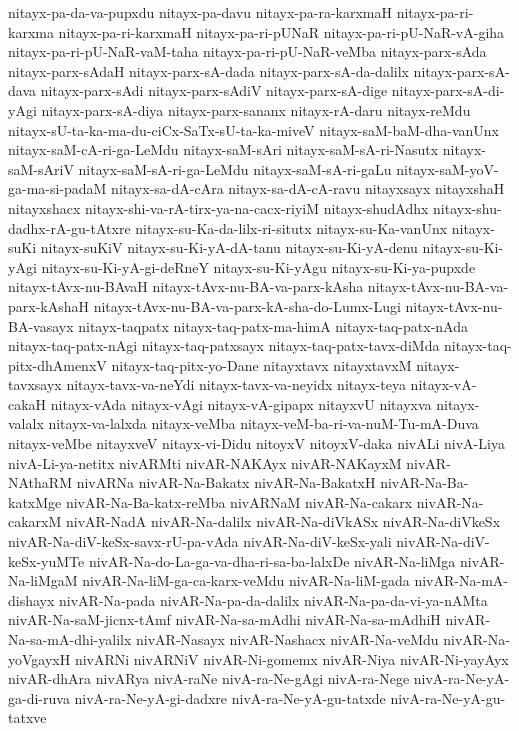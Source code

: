 {nitayx-pa-da-va-pupxdu
nitayx-pa-davu
nitayx-pa-ra-karxmaH
nitayx-pa-ri-karxma
nitayx-pa-ri-karxmaH
nitayx-pa-ri-pUNaR
nitayx-pa-ri-pU-NaR-vA-giha
nitayx-pa-ri-pU-NaR-vaM-taha
nitayx-pa-ri-pU-NaR-veMba
nitayx-parx-sAda
nitayx-parx-sAdaH
nitayx-parx-sA-dada
nitayx-parx-sA-da-dalilx
nitayx-parx-sA-dava
nitayx-parx-sAdi
nitayx-parx-sAdiV
nitayx-parx-sA-dige
nitayx-parx-sA-di-yAgi
nitayx-parx-sA-diya
nitayx-parx-sananx
nitayx-rA-daru
nitayx-reMdu
nitayx-sU-ta-ka-ma-du-ciCx-SaTx-sU-ta-ka-miveV
nitayx-saM-baM-dha-vanUnx
nitayx-saM-cA-ri-ga-LeMdu
nitayx-saM-sAri
nitayx-saM-sA-ri-Nasutx
nitayx-saM-sAriV
nitayx-saM-sA-ri-ga-LeMdu
nitayx-saM-sA-ri-gaLu
nitayx-saM-yoV-ga-ma-si-padaM
nitayx-sa-dA-cAra
nitayx-sa-dA-cA-ravu
nitayxsayx
nitayxshaH
nitayxshacx
nitayx-shi-va-rA-tirx-ya-na-cacx-riyiM
nitayx-shudAdhx
nitayx-shu-dadhx-rA-gu-tAtxre
nitayx-su-Ka-da-lilx-ri-situtx
nitayx-su-Ka-vanUnx
nitayx-suKi
nitayx-suKiV
nitayx-su-Ki-yA-dA-tanu
nitayx-su-Ki-yA-denu
nitayx-su-Ki-yAgi
nitayx-su-Ki-yA-gi-deRneY
nitayx-su-Ki-yAgu
nitayx-su-Ki-ya-pupxde
nitayx-tAvx-nu-BAvaH
nitayx-tAvx-nu-BA-va-parx-kAsha
nitayx-tAvx-nu-BA-va-parx-kAshaH
nitayx-tAvx-nu-BA-va-parx-kA-sha-do-Lumx-Lugi
nitayx-tAvx-nu-BA-vasayx
nitayx-taqpatx
nitayx-taq-patx-ma-himA
nitayx-taq-patx-nAda
nitayx-taq-patx-nAgi
nitayx-taq-patxsayx
nitayx-taq-patx-tavx-diMda
nitayx-taq-pitx-dhAmenxV
nitayx-taq-pitx-yo-Dane
nitayxtavx
nitayxtavxM
nitayx-tavxsayx
nitayx-tavx-va-neYdi
nitayx-tavx-va-neyidx
nitayx-teya
nitayx-vA-cakaH
nitayx-vAda
nitayx-vAgi
nitayx-vA-gipapx
nitayxvU
nitayxva
nitayx-valalx
nitayx-va-lalxda
nitayx-veMba
nitayx-veM-ba-ri-va-nuM-Tu-mA-Duva
nitayx-veMbe
nitayxveV
nitayx-vi-Didu
nitoyxV
nitoyxV-daka
nivALi
nivA-Liya
nivA-Li-ya-netitx
nivARMti
nivAR-NAKAyx
nivAR-NAKayxM
nivAR-NAthaRM
nivARNa
nivAR-Na-Bakatx
nivAR-Na-BakatxH
nivAR-Na-Ba-katxMge
nivAR-Na-Ba-katx-reMba
nivARNaM
nivAR-Na-cakarx
nivAR-Na-cakarxM
nivAR-NadA
nivAR-Na-dalilx
nivAR-Na-diVkASx
nivAR-Na-diVkeSx
nivAR-Na-diV-keSx-savx-rU-pa-vAda
nivAR-Na-diV-keSx-yali
nivAR-Na-diV-keSx-yuMTe
nivAR-Na-do-La-ga-va-dha-ri-sa-ba-lalxDe
nivAR-Na-liMga
nivAR-Na-liMgaM
nivAR-Na-liM-ga-ca-karx-veMdu
nivAR-Na-liM-gada
nivAR-Na-mA-dishayx
nivAR-Na-pada
nivAR-Na-pa-da-dalilx
nivAR-Na-pa-da-vi-ya-nAMta
nivAR-Na-saM-jicnx-tAmf
nivAR-Na-sa-mAdhi
nivAR-Na-sa-mAdhiH
nivAR-Na-sa-mA-dhi-yalilx
nivAR-Nasayx
nivAR-Nashacx
nivAR-Na-veMdu
nivAR-Na-yoVgayxH
nivARNi
nivARNiV
nivAR-Ni-gomemx
nivAR-Niya
nivAR-Ni-yayAyx
nivAR-dhAra
nivARya
nivA-raNe
nivA-ra-Ne-gAgi
nivA-ra-Nege
nivA-ra-Ne-yA-ga-di-ruva
nivA-ra-Ne-yA-gi-dadxre
nivA-ra-Ne-yA-gu-tatxde
nivA-ra-Ne-yA-gu-tatxve
}
